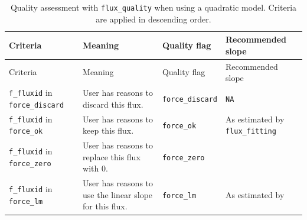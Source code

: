 \documentclass[
  letterpaper,
  DIV=11,
  numbers=noendperiod]{scrartcl}
\begin{document}
\begin{longtable}[]{@{}
  >{\raggedright\arraybackslash}p{}
  >{\raggedright\arraybackslash}p{}
  >{\raggedright\arraybackslash}p{}
  >{\raggedright\arraybackslash}p{}@{}}
\caption{\normalsize Quality assessment with \texttt{flux\_quality} when
using a quadratic model. Criteria are applied in descending
order.}\label{tbl-flagsqua}\tabularnewline
\toprule\noalign{}
\begin{minipage}[b]{\linewidth}\raggedright
Criteria
\end{minipage} & \begin{minipage}[b]{\linewidth}\raggedright
Meaning
\end{minipage} & \begin{minipage}[b]{\linewidth}\raggedright
Quality flag
\end{minipage} & \begin{minipage}[b]{\linewidth}\raggedright
Recommended slope
\end{minipage} \\
\midrule\noalign{}
\endfirsthead
\toprule\noalign{}
\begin{minipage}[b]{\linewidth}\raggedright
Criteria
\end{minipage} & \begin{minipage}[b]{\linewidth}\raggedright
Meaning
\end{minipage} & \begin{minipage}[b]{\linewidth}\raggedright
Quality flag
\end{minipage} & \begin{minipage}[b]{\linewidth}\raggedright
Recommended slope
\end{minipage} \\
\midrule\noalign{}
\endhead
\bottomrule\noalign{}
\endlastfoot
\texttt{f\_fluxid} in \texttt{force\_discard} & User has reasons to
discard this flux. & \texttt{force\_discard} & \texttt{NA} \\
\texttt{f\_fluxid} in \texttt{force\_ok} & User has reasons to keep this
flux. & \texttt{force\_ok} & As estimated by \texttt{flux\_fitting} \\
\texttt{f\_fluxid} in \texttt{force\_zero} & User has reasons to replace
this flux with 0. & \texttt{force\_zero} & 0 \\
\texttt{f\_fluxid} in \texttt{force\_lm} & User has reasons to use the
linear slope for this flux. & \texttt{force\_lm} & As estimated by

\end{longtable}
\end{document}
